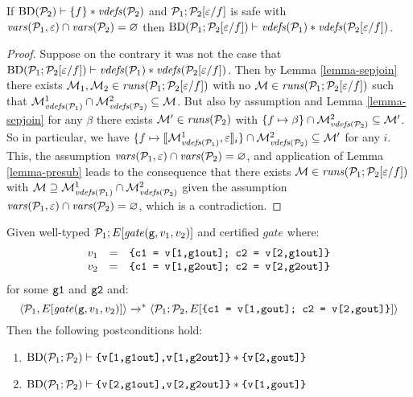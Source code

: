 \begin{lemma}[Substitution]
  \label{lemma-substitution}
  If $\mathrm{BD}(\mathcal{P}_2) \vdash \{ f \} * \mathit{vdefs}(\mathcal{P}_2)$ and
  $\mathcal{P}_1;\mathcal{P}_2[\varepsilon/f]$ is safe with $\mathit{vars}(\mathcal{P}_1,\varepsilon) \cap
  \mathit{vars}(\mathcal{P}_2) = \varnothing$ then
  $\mathrm{BD}(\mathcal{P}_1;\mathcal{P}_2[\varepsilon/f]) \vdash \mathit{vdefs}(\mathcal{P}_1) * \mathit{vdefs}(\mathcal{P}_2[\varepsilon/f])$.
\end{lemma}
\begin{proof}
  Suppose on the contrary it was not the case that
  $\mathrm{BD}(\mathcal{P}_1;\mathcal{P}_2[\varepsilon/f]) \vdash \mathit{vdefs}(\mathcal{P}_1) * \mathit{vdefs}(\mathcal{P}_2[\varepsilon/f])$.
  Then by Lemma \ref{lemma-sepjoin} there exists $\mathcal{M}_1,\mathcal{M}_2
  \in \mathit{runs}(\mathcal{P}_1;\mathcal{P}_2[\varepsilon/f])$ with no $\mathcal{M} \in
  \mathit{runs}(\mathcal{P}_1;\mathcal{P}_2[\varepsilon/f])$ such that $\mathcal{M}^1_{\mathit{vdefs}(\mathcal{P}_1)}
  \cap \mathcal{M}^2_{\mathit{vdefs}(\mathcal{P}_2)} \subseteq \mathcal{M}$.  But also by
  assumption and Lemma \ref{lemma-sepjoin} for any $\beta$ there
  exists $\mathcal{M}' \in \mathit{runs}(\mathcal{P}_2)$ with $\{ f \mapsto \beta \} \cap
  \mathcal{M}^2_{\mathit{vdefs}(\mathcal{P}_2)} \subseteq \mathcal{M}'$. So in particular, we
  have $\{ f \mapsto \llbracket \mathcal{M}^1_{\mathit{vdefs}(\mathcal{P}_1)},\varepsilon \rrbracket_{i} \} \cap
  \mathcal{M}^2_{\mathit{vdefs}(\mathcal{P}_2)} \subseteq \mathcal{M}'$ for any $i$. This, the
  assumption $\mathit{vars}(\mathcal{P}_1,\varepsilon) \cap \mathit{vars}(\mathcal{P}_2) = \varnothing$,
  and application of Lemma \ref{lemma-presub} leads to the consequence
  that there exists $\mathcal{M} \in \mathit{runs}(\mathcal{P}_1;\mathcal{P}_2[\varepsilon/f])$ with
  $\mathcal{M} \supseteq \mathcal{M}^1_{\mathit{vdefs}(\mathcal{P}_1)} \cap
  \mathcal{M}^2_{\mathit{vdefs}(\mathcal{P}_2)}$ given the assumption $\mathit{vars}(\mathcal{P}_1,\varepsilon)
  \cap \mathit{vars}(\mathcal{P}_2) = \varnothing$, which is a contradiction.
\end{proof}

\begin{lemma}
  \label{lemma-composition-gmw}
  Given well-typed $\mathcal{P}_1;E[\mathit{gate}(\texttt{g},v_1,v_2)]$ and certified $\mathit{gate}$ where:
  $$
  \begin{array}{lcr}
   v_1 &=& \texttt{\{c1 = v[1,g1out]; c2 = v[2,g1out]\}}\\
   v_2 &=& \texttt{\{c1 = v[1,g2out]; c2 = v[2,g2out]\}}
  \end{array}
  $$
  for some $\texttt{g1}$ and $\texttt{g2}$ and:
  $$
  \langle \mathcal{P}_1,E[\mathit{gate}(\texttt{g},v_1,v_2)] \rangle \xrightarrow{}^{*} \langle \mathcal{P}_1;\mathcal{P}_2,E[\texttt{\{c1 = v[1,gout]; c2 = v[2,gout]\}}] \rangle
  $$
  Then the following postconditions hold:
  \begin{enumerate}
  \item $\mathrm{BD}(\mathcal{P}_1;\mathcal{P}_2) \vdash \texttt{\{v[1,g1out],v[1,g2out]\}} * \texttt{\{v[2,gout]\}}$
  \item $\mathrm{BD}(\mathcal{P}_1;\mathcal{P}_2) \vdash \texttt{\{v[2,g1out],v[2,g2out]\}} * \texttt{\{v[1,gout]\}}$
  \end{enumerate}
\end{lemma}


